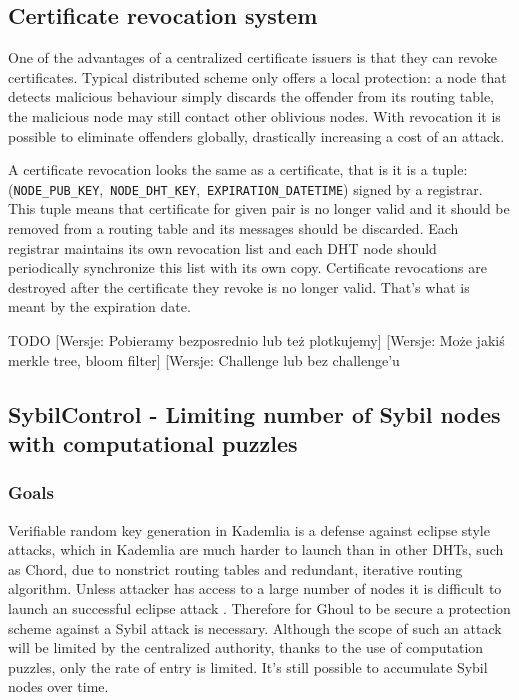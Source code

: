 \subsection{Certificate revocation system}

One of the advantages of a centralized certificate issuers is that they can
revoke certificates. Typical distributed scheme only offers a local protection:
a node that detects malicious behaviour simply discards the offender from its
routing table, the malicious node may still contact other oblivious nodes. With
revocation it is possible to eliminate offenders globally, drastically
increasing a cost of an attack.

A certificate revocation looks the same as a certificate, that is it is a
tuple:\\
(\texttt{NODE\_PUB\_KEY},~\texttt{NODE\_DHT\_KEY},~\texttt{EXPIRATION\_DATETIME})
signed by a registrar. This tuple means that certificate for given pair is no
longer valid and it should be removed from a routing table and its messages
should be discarded. Each registrar maintains its own revocation list and each
DHT node should periodically synchronize this list with its own copy.
Certificate revocations are destroyed after the certificate they revoke is no
longer valid. That's what is meant by the expiration date.

TODO
[Wersje: Pobieramy bezposrednio lub też plotkujemy]
[Wersje: Może jakiś merkle tree, bloom filter]
[Wersje: Challenge lub bez challenge'u

\subsection{SybilControl - Limiting number of Sybil nodes with computational
puzzles}
\subsubsection{Goals}
  Verifiable random key generation in Kademlia is a defense against eclipse
  style attacks, which in Kademlia are much harder to launch than in other
  DHTs, such as Chord, due to nonstrict routing tables and redundant, iterative
  routing algorithm. Unless attacker has access to a large number of nodes it is
  difficult to launch an successful eclipse attack \cite{mac09}. Therefore for
  Ghoul to be secure a protection scheme against a Sybil attack is necessary.
  Although the scope of such an attack will be limited by the centralized
  authority, thanks to the use of computation puzzles, only the rate of
  entry is limited. It's still possible to accumulate Sybil nodes over time.

